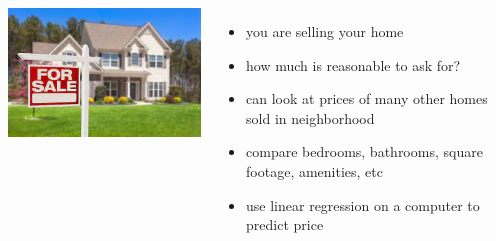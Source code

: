 \documentclass[handout]{beamer}
\begin{document}
\begin{frame}{}
 \begin{columns}
    \centering
             \includegraphics[width=\linewidth]{img/forsale.jpg}
    \begin{itemize}
      \item you are selling your home
      \item how much is reasonable to ask for?
      \item can look at prices of many other homes sold in neighborhood
      \item compare bedrooms, bathrooms, square footage, amenities, etc
      \item use linear regression on a computer to predict price
    \end{itemize}
 \end{columns} 
\end{frame}
\end{document}
